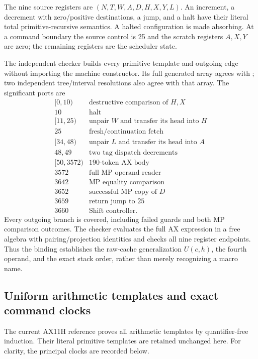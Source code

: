 The nine source registers are
$(N,T,W,A,D,H,X,Y,L)$.
An increment, a decrement with zero/positive destinations, a jump,
and a halt have their literal total primitive-recursive semantics.
A halted configuration is made absorbing. At a command boundary
the source control is 25 and the scratch registers $A,X,Y$ are zero;
the remaining registers are the scheduler state.

The independent checker 
builds every primitive template and outgoing edge without importing
the machine constructor. Its full generated array agrees with
; two independent tree/interval resolutions
also agree with that array. The significant ports are
\[
\begin{array}{c|l}
{[0,10)}&\text{destructive comparison of }H,X\\
10&\text{halt}\\
{[11,25)}&\text{unpair }W\text{ and transfer its head into }H\\
25&\text{fresh/continuation fetch}\\
{[34,48)}&\text{unpair }L\text{ and transfer its head into }A\\
48,49&\text{two tag dispatch decrements}\\
{[50,3572)}&\text{190-token AX body}\\
3572&\text{full MP operand reader}\\
3642&\text{MP equality comparison}\\
3652&\text{successful MP copy of }D\\
3659&\text{return jump to 25}\\
3660&\text{Shift controller}.
\end{array}
\]
Every outgoing branch is covered, including failed guards and both
MP comparison outcomes. The checker evaluates the full AX expression
in a free algebra with pairing/projection identities and checks all
nine register endpoints. Thus the binding establishes the raw-cache
generalization $U(c,h)$, the fourth operand, and the exact stack
order, rather than merely recognizing a macro name.

\subsection{Uniform arithmetic templates and exact command clocks}

The current AX11H reference 
proves all arithmetic templates by quantifier-free induction. Their
literal primitive templates are retained unchanged here. For
clarity, the principal clocks are recorded below.

